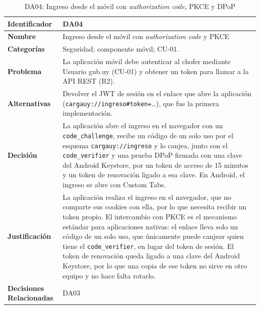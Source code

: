 \begin{table}[H]
    \small
    \centering
    \caption{DA04: Ingreso desde el móvil con \textit{authorization code}, PKCE y DPoP}
    \label{tab:da04}
    \begin{tabular}{|p{4.1cm}|p{11.7cm}|}
        \hline
            \textbf{Identificador} & DA04 \\
        \hline
            \textbf{Nombre} & Ingreso desde el móvil con \textit{authorization code} y PKCE \\
        \hline
            \textbf{Categorías} & Seguridad; componente móvil; CU-01. \\
        \hline
            \textbf{Problema} & La aplicación móvil debe autenticar al chofer mediante Usuario gub.uy (CU-01) y obtener un token para llamar a la API REST (R2). \\
        \hline
            \textbf{Alternativas} & Devolver el JWT de sesión en el enlace que abre la aplicación (\texttt{cargauy://ingreso\#token=}\ldots), que fue la primera implementación. \\
        \hline
            \textbf{Decisión} & La aplicación abre el ingreso en el navegador con un \texttt{code\_challenge}, recibe un código de un solo uso por el esquema \texttt{cargauy://ingreso} y lo canjea, junto con el \texttt{code\_verifier} y una prueba DPoP firmada con una clave del Android Keystore, por un token de acceso de 15 minutos y un token de renovación ligado a esa clave. En Android, el ingreso se abre con Custom Tabs. \\
        \hline
            \textbf{Justificación} & La aplicación realiza el ingreso en el navegador, que no comparte sus cookies con ella, por lo que necesita recibir un token propio. El intercambio con PKCE es el mecanismo estándar para aplicaciones nativas: el enlace lleva solo un código de un solo uso, que únicamente puede canjear quien tiene el \texttt{code\_verifier}, en lugar del token de sesión. El token de renovación queda ligado a una clave del Android Keystore, por lo que una copia de ese token no sirve en otro equipo y no hace falta rotarlo. \\
        \hline
            \textbf{Decisiones Relacionadas} & DA03 \\
        \hline
    \end{tabular}
\end{table}

